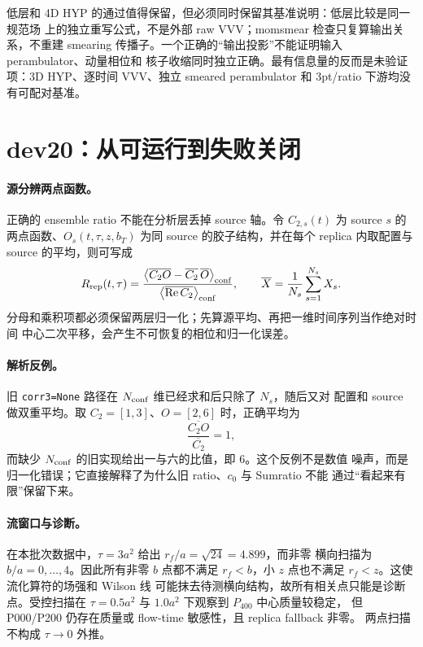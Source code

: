 低层和 4D HYP 的通过值得保留，但必须同时保留其基准说明：低层比较是同一规范场
上的独立重写公式，不是外部 raw VVV；momsmear 检查只复算输出关系，不重建
smearing 传播子。一个正确的“输出投影”不能证明输入 perambulator、动量相位和
核子收缩同时独立正确。最有信息量的反而是未验证项：3D HYP、逐时间 VVV、独立
smeared perambulator 和 3pt/ratio 下游均没有可配对基准。

\section{dev20：从可运行到失败关闭}
\label{sec:b08-dev20}

\paragraph{源分辨两点函数。}
正确的 ensemble ratio 不能在分析层丢掉 source 轴。令
\(C_{2,s}(t)\) 为 source \(s\) 的两点函数、\(O_s(t,\tau,z,b_T)\) 为同 source
的胶子结构，并在每个 replica 内取配置与 source 的平均，则可写成
\begin{equation}
  R_{\rm rep}(t,\tau)
  =\frac{\left\langle \overline{C_2O}
  -\overline{C_2}\,\overline{O}\right\rangle_{\rm conf}}
  {\left\langle \overline{\mathrm{Re}\,C_2}\right\rangle_{\rm conf}},
  \qquad
  \overline{X}=\frac{1}{N_s}\sum_{s=1}^{N_s}X_s.
  \label{eq:b08-source-ratio}
\end{equation}
分母和乘积项都必须保留两层归一化；先算源平均、再把一维时间序列当作绝对时间
中心二次平移，会产生不可恢复的相位和归一化误差。

\paragraph{解析反例。}
旧 \texttt{corr3=None} 路径在 \(N_{\rm conf}\) 维已经求和后只除了 \(N_s\)，随后又对
配置和 source 做双重平均。取 \(C_2=[1,3]\)、\(O=[2,6]\) 时，正确平均为
\begin{equation}
  \frac{\overline{C_2O}}{\overline{C_2}}=1,
  \label{eq:b08-correct-example}
\end{equation}
而缺少 \(N_{\rm conf}\) 的旧实现给出一与六的比值，即 6。这个反例不是数值
噪声，而是归一化错误；它直接解释了为什么旧 ratio、\(c_0\) 与 Sumratio 不能
通过“看起来有限”保留下来。

\paragraph{流窗口与诊断。}
在本批次数据中，\(\tau=3a^2\) 给出 \(r_f/a=\sqrt{24}=4.899\)，而非零
横向扫描为 \(b/a=0,\ldots,4\)。因此所有非零 \(b\) 点都不满足
\(r_f<b\)，小 \(z\) 点也不满足 \(r_f<z\)。这使流化算符的场强和 Wilson 线
可能抹去待测横向结构，故所有相关点只能是诊断点。受控扫描在
\(\tau=0.5a^2\) 与 \(1.0a^2\) 下观察到 \(P_{400}\) 中心质量较稳定，
但 P000/P200 仍存在质量或 flow-time 敏感性，且 replica fallback 非零。
两点扫描不构成 \(\tau\to0\) 外推。

